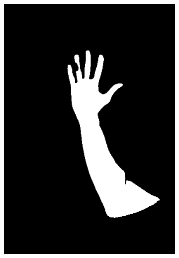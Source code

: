 \begin{figure}[h]
{\begin{subfigure}[b]{0.23\textwidth}
         \includegraphics[width=\textwidth]{images/results/cross/5_A_hgr2B_id10_1_ecu_hgr_skinny_123.png}
     \end{subfigure}
    \hfill
     \begin{subfigure}[b]{0.23\textwidth}
         \centering

\end{subfigure}}
\end{figure}
